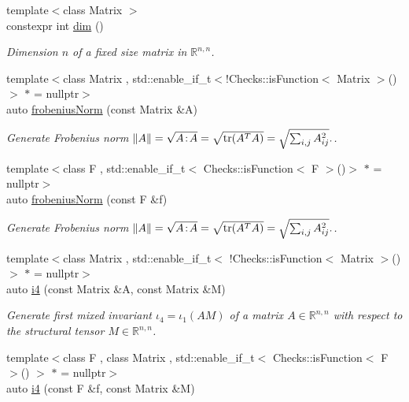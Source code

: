 \begin{DoxyCompactItemize}
{\footnotesize template$<$class Matrix $>$ }\\constexpr int \hyperlink{namespaceFunG_1_1LinearAlgebra_a13a029820c29d530274ae94968d642d4}{dim} ()
\begin{DoxyCompactList}\small\item\em Dimension $n$ of a fixed size matrix in $\mathbb{R}^{n,n}$. \end{DoxyCompactList}\item 
{\footnotesize template$<$class Matrix , std\-::enable\-\_\-if\-\_\-t$<$!\-Checks\-::is\-Function$<$ Matrix $>$()$>$ $\ast$  = nullptr$>$ }\\auto \hyperlink{group__LinearAlgebraGroup_gaa893e7d667dde98d2b119ca004745186}{frobenius\-Norm} (const Matrix \&A)
\begin{DoxyCompactList}\small\item\em Generate Frobenius norm $ \|A\| = \sqrt{A\negthinspace : \negthinspace A }= \sqrt{\mathrm{tr}(A^TA)} = \sqrt{\sum_{i,j} A_{ij}^2}. $. \end{DoxyCompactList}\item 
{\footnotesize template$<$class F , std\-::enable\-\_\-if\-\_\-t$<$ Checks\-::is\-Function$<$ F $>$()$>$ $\ast$  = nullptr$>$ }\\auto \hyperlink{group__LinearAlgebraGroup_gafa2f358f9310cecb787620ad8ec460a6}{frobenius\-Norm} (const F \&f)
\begin{DoxyCompactList}\small\item\em Generate Frobenius norm $ \|A\| = \sqrt{A\negthinspace : \negthinspace A }= \sqrt{\mathrm{tr}(A^TA)} = \sqrt{\sum_{i,j} A_{ij}^2}. $. \end{DoxyCompactList}\item 
{\footnotesize template$<$class Matrix , std\-::enable\-\_\-if\-\_\-t$<$ !\-Checks\-::is\-Function$<$ Matrix $>$() $>$ $\ast$  = nullptr$>$ }\\auto \hyperlink{group__InvariantGroup_ga1898785172ecce11af0c27e54d555009}{i4} (const Matrix \&A, const Matrix \&M)
\begin{DoxyCompactList}\small\item\em Generate first mixed invariant $ \iota_4=\iota_1(AM) $ of a matrix $A\in\mathbb{R}^{n,n}$ with respect to the structural tensor $M\in\mathbb{R}^{n,n}$. \end{DoxyCompactList}\item 
{\footnotesize template$<$class F , class Matrix , std\-::enable\-\_\-if\-\_\-t$<$ Checks\-::is\-Function$<$ F $>$() $>$ $\ast$  = nullptr$>$ }\\auto \hyperlink{group__InvariantGroup_ga0df96cdb1e4b8b5a040f2adc97c51100}{i4} (const F \&f, const Matrix \&M)

\end{DoxyCompactItemize}
